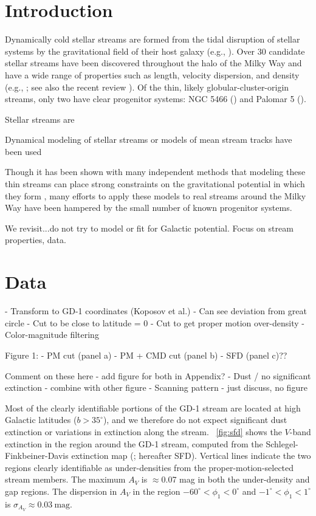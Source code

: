 \documentclass[modern]{aastex62}
\begin{document}

\section{Introduction}
\label{sec:intro}

Dynamically cold stellar streams are formed from the tidal disruption of stellar
systems by the gravitational field of their host galaxy (e.g.,
\citealt{Johnston:1998}).
Over 30 candidate stellar streams have been discovered throughout the halo of
the Milky Way and have a wide range of properties such as length, velocity
dispersion, and density (e.g., \citealt{SoManyPeople,Bonaca:2012}; see also the
recent review \citealt{Grillmair:2006, Newberg:2016}).
Of the thin, likely globular-cluster-origin streams, only two have clear
progenitor systems: NGC 5466 (\citealt{TODO}) and Palomar 5 (\citealt{TODO}).

Stellar streams are

\citealt{Bonaca:2018}

Dynamical modeling of stellar streams or models of mean stream tracks have been used


Though it has been shown with many independent methods that modeling these thin streams can place strong constraints on the gravitational potential in which they form \citep{apw14,TODO}, many efforts to apply these models to real streams around the Milky Way have been hampered by the small number of known progenitor systems.


We revisit...do not try to model or fit for Galactic potential. Focus on stream properties, data.

\section{Data}
\label{sec:data}

- Transform to GD-1 coordinates (Koposov et al.)
    - Can see deviation from great circle
- Cut to be close to latitude = 0
- Cut to get proper motion over-density
- Color-magnitude filtering

Figure 1:
- PM cut (panel a)
- PM + CMD cut (panel b)
- SFD (panel c)??

Comment on these here - add figure for both in Appendix?
- Dust / no significant extinction - combine with other figure
- Scanning pattern - just discuss, no figure

Most of the clearly identifiable portions of the GD-1 stream are located at high
Galactic latitudes ($b > 35^\circ$), and we therefore do not expect significant
dust extinction or variations in extinction along the stream.
\figurename~\ref{fig:sfd} shows the $V$-band extinction in the region around the
GD-1 stream, computed from the Schlegel-Finkbeiner-Davis extinction map
(\cite{Schlegel:1998}; hereafter SFD).
Vertical lines indicate the two regions clearly identifiable as under-densities
from the proper-motion-selected stream members.
The maximum $A_V$ is $\approx$0.07 mag in both the under-density and gap
regions.
The dispersion in $A_V$ in the region $-60^\circ < \phi_1 < 0^\circ$ and
$-1^\circ < \phi_1 < 1^\circ$ is $\sigma_{A_V} \approx 0.03~\textrm{mag}$.
\end{document}
